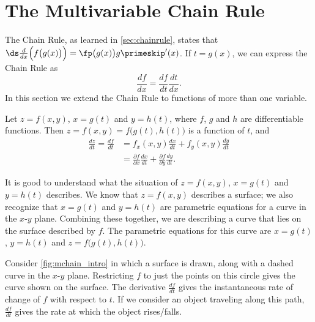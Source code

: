 \section{The Multivariable Chain Rule}\label{sec:multi_chain}

The Chain Rule, as learned in \autoref{sec:chainrule}, states that $\ds \frac{d}{dx}\Big(f\big(g(x)\big)\Big) = \fp\big(g(x)\big)g\primeskip'(x)$. If $t=g(x)$, we can express the Chain Rule as 
$$\frac{df}{dx} = \frac{df}{dt}\frac{dt}{dx}.$$
In this section we extend the Chain Rule to functions of more than one variable.

{Let $z=f(x,y)$, $x=g(t)$ and $y=h(t)$, where $f$, $g$ and $h$ are differentiable functions. Then $z = f(x,y) = f\big(g(t),h(t)\big)$ is a function of $t$, and 
\begin{align*}
\frac{dz}{dt} = \frac{df}{dt} &= f_x(x,y)\frac{dx}{dt}+f_y(x,y)\frac{dy}{dt}\\[5pt]
		&= \frac{\partial f}{\partial x}\frac{dx}{dt}+\frac{\partial f}{\partial y}\frac{dy}{dt}.
\end{align*}
}

It is good to understand what the situation of $z=f(x,y)$, $x=g(t)$ and $y=h(t)$ describes. We know that $z=f(x,y)$ describes a surface; we also recognize that $x=g(t)$ and $y=h(t)$ are parametric equations for a curve in the $x$-$y$ plane. Combining these together, we are describing a curve that lies on the surface described by $f$. The parametric equations for this curve are $x=g(t)$, $y=h(t)$ and $z=f\big(g(t),h(t)\big)$.

Consider \autoref{fig:mchain_intro} in which a surface is drawn, along with a dashed curve in the $x$-$y$ plane. Restricting $f$ to just the points on this circle gives the curve shown on the surface. The derivative $\frac{df}{dt}$ gives the instantaneous rate of change of $f$ with respect to $t$. If we consider an object traveling along this path, $\frac{df}{dt}$ gives the rate at which the object rises/falls.


